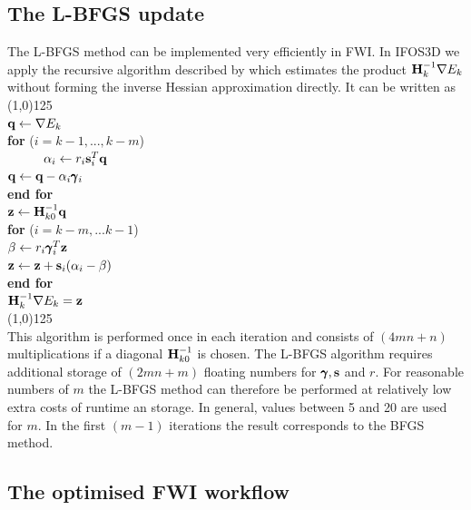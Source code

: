 \subsection{The L-BFGS update}
The L-BFGS method can be implemented very efficiently in FWI. In IFOS3D we apply the recursive algorithm described by \cite{Noc99} which estimates the product $\textbf H_k^{-1}\nabla E_k$ without forming the inverse Hessian approximation directly. It can be written as \vspace{0.5cm}\\
\line(1,0){125}\\
$\textbf q \leftarrow \nabla E_k$\\
\textbf{for} ($i=k-1,...,k-m$)\\
$\hspace*{1cm} \alpha_i \leftarrow r_i\textbf s_i^T\textbf q$\\
\hspace*{1cm} $\textbf q\leftarrow\textbf q-\alpha_i\pmb{\gamma}_i$\\
\textbf{end for}\\
$\textbf z \leftarrow \textbf H_{k0}^{-1}\textbf q$\\
\textbf{for} ($i=k-m,...k-1$)\\
\hspace*{1cm}$\beta\leftarrow r_i\pmb{\gamma}_i^T\textbf z$\\
\hspace*{1cm}$\textbf z\leftarrow\textbf z+\textbf s_i(\alpha_i-\beta)$\\
\textbf{end for}\\
$\textbf H_k^{-1}\nabla E_k=\textbf z$\\
\line(1,0){125}\vspace{0.5cm}\\
This algorithm is performed once in each iteration and consists of $(4mn+n)$ multiplications if a diagonal $\textbf H_{k0}^{-1}$ is chosen. The L-BFGS algorithm requires additional storage of $(2mn+m)$ floating numbers for $\pmb\gamma, \textbf s$ and $r$. For reasonable numbers of $m$ the L-BFGS method can therefore be performed at relatively low extra costs of runtime an storage. In general, values between 5 and 20 are used for $m$. In the first $(m-1)$ iterations the result corresponds to the BFGS method. 
\subsection{The optimised FWI workflow}
